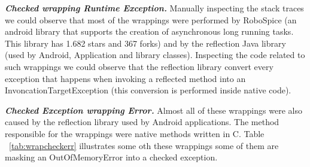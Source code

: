 \documentclass[conference]{IEEEtran}
\begin{document}
\emph{\textbf{Checked wrapping Runtime Exception.}} Manually inspecting the stack 
traces we could observe that most of the wrappings were performed 
by RoboSpice (an android library that supports the creation of asynchronous long running tasks.
This library has 1.682 stars and 367 forks) and by the reflection Java library (used by Android, 
Application and library classes). Inspecting the code related to such wrappings we could observe that
the reflection library convert every exception that happens 
when invoking a reflected method into an InvoncationTargetException (this conversion is 
performed inside native code).



\emph{\textbf{Checked Exception wrapping Error.}} Almost all of these wrappings
 were also caused by the reflection library 
used by Android applications. The method responsible for the wrappings
were native methods written in C. Table  ~\ref{tab:wrapcheckerr} illustrates
some oth these wrappings some of them are masking an OutOfMemoryError
into a checked exception.

\end{document}
